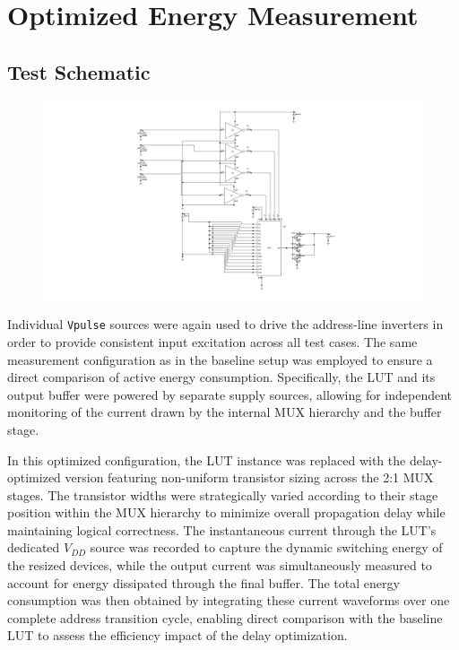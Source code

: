 \documentclass[12pt]{article}
\begin{document}
\section{Optimized Energy Measurement}
\subsection{Test Schematic}

\begin{figure}[H]
    \centering
    \includegraphics[width=\linewidth]{writeup//figures/updated_energy_opt_testchem.png}
    \caption{}
\end{figure}

Individual \texttt{Vpulse} sources were again used to drive the address-line inverters in order to provide consistent input excitation across all test cases. The same measurement configuration as in the baseline setup was employed to ensure a direct comparison of active energy consumption. Specifically, the LUT and its output buffer were powered by separate supply sources, allowing for independent monitoring of the current drawn by the internal MUX hierarchy and the buffer stage.

In this optimized configuration, the LUT instance was replaced with the delay-optimized version featuring non-uniform transistor sizing across the 2:1 MUX stages. The transistor widths were strategically varied according to their stage position within the MUX hierarchy to minimize overall propagation delay while maintaining logical correctness. The instantaneous current through the LUT’s dedicated $V_{DD}$ source was recorded to capture the dynamic switching energy of the resized devices, while the output current was simultaneously measured to account for energy dissipated through the final buffer. The total energy consumption was then obtained by integrating these current waveforms over one complete address transition cycle, enabling direct comparison with the baseline LUT to assess the efficiency impact of the delay optimization.
\end{document}
